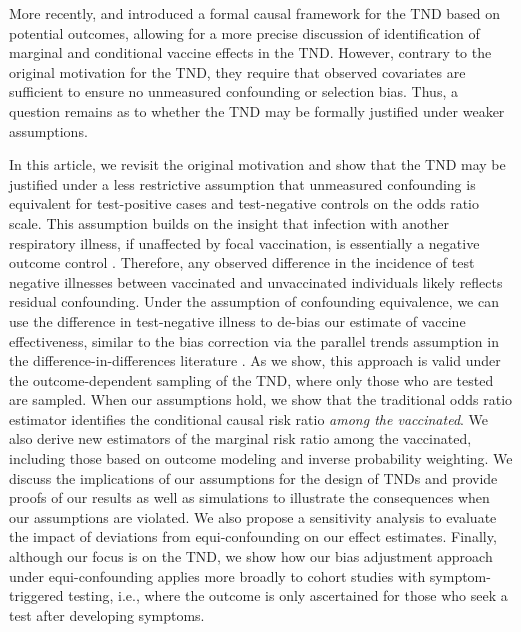 \documentclass[11pt]{article}
\begin{document}
More recently, \textcite{schnitzer_estimands_2022} and \textcite{jiang_tnddr_2023} introduced a formal causal framework for the TND based on potential outcomes, allowing for a more precise discussion of identification of marginal and conditional vaccine effects in the TND. However, contrary to the original motivation for the TND, they require that observed covariates are sufficient to ensure no unmeasured confounding or selection bias. Thus, a question remains as to whether the TND may be formally justified under weaker assumptions.

In this article, we revisit the original motivation and show that the TND may be justified under a less restrictive assumption that unmeasured confounding is equivalent for test-positive cases and test-negative controls on the odds ratio scale. This assumption builds on the insight that infection with another respiratory illness, if unaffected by focal vaccination, is essentially a negative outcome control \cite{lipsitch_negative_2010,shi_selective_2020,piccininni_using_2024}. Therefore, any observed difference in the incidence of test negative illnesses between vaccinated and unvaccinated individuals likely reflects residual confounding. Under the assumption of confounding equivalence, we can  use the difference in test-negative illness to de-bias our estimate of vaccine effectiveness, similar to the bias correction via the parallel trends assumption in the difference-in-differences literature \cite{sofer_negative_2016,park_universal_2023,tchetgen_universal_2023}. As we show, this approach is valid under the outcome-dependent sampling of the TND, where only those who are tested are sampled. When our assumptions hold, we show that the traditional odds ratio estimator identifies the conditional causal risk ratio \textit{among the vaccinated}. We also derive new estimators of the marginal risk ratio among the vaccinated, including those based on outcome modeling and inverse probability weighting. We discuss the implications of our assumptions for the design of TNDs and provide proofs of our results as well as simulations to illustrate the consequences when our assumptions are violated. We also propose a sensitivity analysis to evaluate the impact of deviations from equi-confounding on our effect estimates. Finally, although our focus is on the TND, we show how our bias adjustment approach under equi-confounding applies more broadly to cohort studies with symptom-triggered testing, i.e., where the outcome is only ascertained for those who seek a test after developing symptoms.
\end{document}
